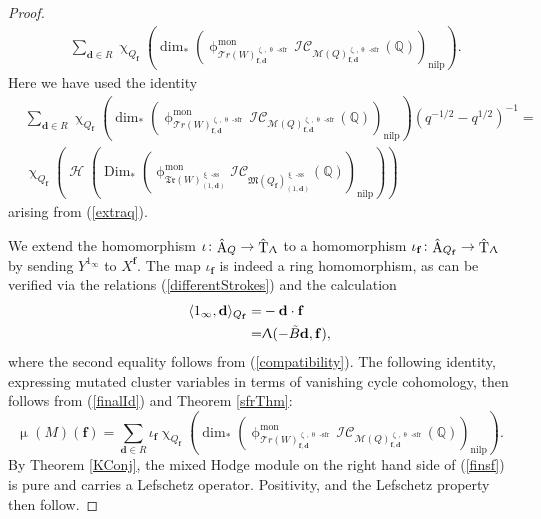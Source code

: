 \documentclass[a4paper,10pt]{amsart}
\newcommand{\dd}{\mathbf{d}}
\newcommand{\ff}{\mathbf{f}}
\newcommand{\QQ}{\mathbb{Q}}
\DeclareMathOperator{\sfr}{-sfr}
\newcommand{\WW}{\mathcal{T}r(W)}
\newcommand{\WWW}{\mathfrak{Tr}(W)}
\newcommand{\Mst}{\mathfrak{M}}
\newcommand{\Msp}{\mathcal{M}}
\newcommand{\ICS}{\mathcal{IC}}
\newcommand{\phim}[1]{\phi^{\mon}_{#1}}
\renewcommand{\theta}{\uptheta}
\renewcommand{\zeta}{\upzeta}
\renewcommand{\xi}{\upxi}
\renewcommand{\chi}{\upchi}
\renewcommand{\Lambda}{\Uplambda}
\renewcommand{\phi}{\upphi}
\renewcommand{\mu}{\upmu}
\DeclareMathOperator{\sst}{-ss}
\DeclareMathOperator{\nilp}{nilp}
\DeclareMathOperator{\Dim}{Dim}
\DeclareMathOperator{\Tor}{T}
\DeclareMathOperator{\Ror}{A}
\DeclareMathOperator{\mon}{mon}
\DeclareMathOperator{\Ss}{\overline{s}}
\DeclareMathOperator{\Ho}{\mathcal{H}}
\begin{document}
\begin{proof}
\begin{align}
&\sum_{\dd\in R}\chi_{Q_{\ff}}\left( \dim_*\left(\phim{\WW_{\ff,\dd}^{\zeta_{\Ss},\theta_{\Ss}\sfr}}\ICS_{\Msp(Q)_{\ff,\dd}^{\zeta_{\Ss},\theta_{\Ss}\sfr}}(\QQ)\right)_{\nilp} \right).\nonumber
\end{align}
Here we have used the identity
\begin{align*}
&\sum_{\dd\in R}\chi_{Q_{\ff}}\left( \dim_*\left(\phim{\WW_{\ff,\dd}^{\zeta_{\Ss},\theta_{\Ss}\sfr}}\ICS_{\Msp(Q)_{\ff,\dd}^{\zeta_{\Ss},\theta_{\Ss}\sfr}}(\QQ)\right)_{\nilp} \right)(q^{-1/2}-q^{1/2})^{-1}=\\&\chi_{Q_{\ff}}\left( \Ho\left(\Dim_*\left(\phim{\WWW_{(1,\dd)}^{\xi\sst}}\ICS_{\Mst(Q_\ff)_{(1,\dd)}^{\xi\sst}}(\mathbb{Q})\right)_{\nilp}\right)  \right)
\end{align*}
arising from (\ref{extraq}).

We extend the homomorphism $\iota\colon\hat{\Ror}_Q\rightarrow \hat{\Tor}_{\Lambda}$ to a homomorphism $\iota_{\ff}\colon\hat{\Ror}_{Q_{\ff}}\rightarrow\hat{\Tor}_{\Lambda}$ by sending $Y^{1_\infty}$ to $X^{\ff}$.  The map $\iota_{\ff}$ is indeed a ring homomorphism, as can be verified via the relations (\ref{differentStrokes}) and the calculation
\begin{align*}
\langle 1_{\infty},\dd\rangle_{Q_{\ff}}=&-\dd\cdot \ff\\
=&\Lambda(-\tilde{B}\dd,\ff),
\end{align*}
where the second equality follows from (\ref{compatibility}).  The following identity, expressing mutated cluster variables in terms of vanishing cycle cohomology, then follows from (\ref{finalId}) and Theorem \ref{sfrThm}:
\begin{equation}
\label{finsf}
\mu_{\Ss}(M)(\ff)=\sum_{\dd\in R}\iota_{\ff}\chi_{Q_{\ff}}\left( \dim_*\left(\phim{\WW_{\ff,\dd}^{\zeta_{\Ss},\theta_{\Ss}\sfr}}\ICS_{\Msp(Q)_{\ff,\dd}^{\zeta_{\Ss},\theta_{\Ss}\sfr}}(\QQ)\right)_{\nilp}\right).
\end{equation}
By Theorem \ref{KConj}, the mixed Hodge module on the right hand side of (\ref{finsf}) is pure and carries a Lefschetz operator.  Positivity, and the Lefschetz property then follow.  


\end{proof}
\end{document}
